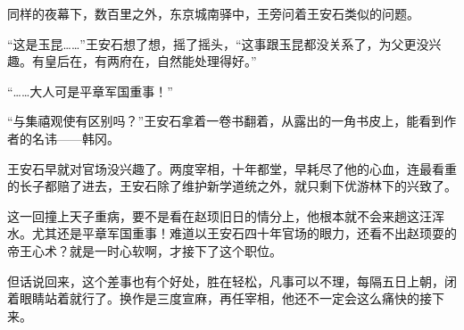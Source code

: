 同样的夜幕下，数百里之外，东京城南驿中，王旁问着王安石类似的问题。

“这是玉昆……”王安石想了想，摇了摇头，“这事跟玉昆都没关系了，为父更没兴趣。有皇后在，有两府在，自然能处理得好。”

“……大人可是平章军国重事！”

“与集禧观使有区别吗？”王安石拿着一卷书翻着，从露出的一角书皮上，能看到作者的名讳——韩冈。

王安石早就对官场没兴趣了。两度宰相，十年都堂，早耗尽了他的心血，连最看重的长子都赔了进去，王安石除了维护新学道统之外，就只剩下优游林下的兴致了。

这一回撞上天子重病，要不是看在赵顼旧日的情分上，他根本就不会来趟这汪浑水。尤其还是平章军国重事！难道以王安石四十年官场的眼力，还看不出赵顼耍的帝王心术？就是一时心软啊，才接下了这个职位。

但话说回来，这个差事也有个好处，胜在轻松，凡事可以不理，每隔五日上朝，闭着眼睛站着就行了。换作是三度宣麻，再任宰相，他还不一定会这么痛快的接下来。

